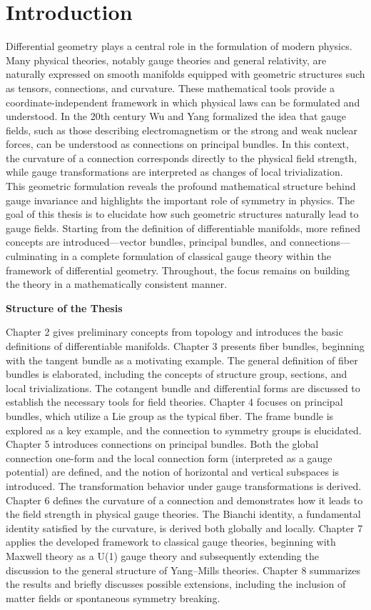 \chapter{Introduction}

Differential geometry plays a central role in the formulation of modern physics. Many physical theories, notably gauge theories and general relativity, are naturally expressed on smooth manifolds equipped with geometric structures such as tensors, connections, and curvature. These mathematical tools provide a coordinate-independent framework in which physical laws can be formulated and understood. In the 20th century Wu and Yang formalized the idea that gauge fields, such as those describing electromagnetism or the strong and weak nuclear forces, can be understood as connections on principal bundles\cite{WuConceptnonintegrablephasefactorsglobalformulationgaugefields1975}. In this context, the curvature of a connection corresponds directly to the physical field strength, while gauge transformations are interpreted as changes of local trivialization. This geometric formulation reveals the profound mathematical structure behind gauge invariance and highlights the important role of symmetry in physics. The goal of this thesis is to elucidate how such geometric structures naturally lead to gauge fields. Starting from the definition of differentiable manifolds, more refined concepts are introduced—vector bundles, principal bundles, and connections—culminating in a complete formulation of classical gauge theory within the framework of differential geometry. Throughout, the focus remains on building the theory in a mathematically consistent manner. 

\textbf{Structure of the Thesis}

Chapter 2 gives preliminary concepts from topology and introduces the basic definitions of differentiable manifolds. Chapter 3 presents fiber bundles, beginning with the tangent bundle as a motivating example. The general definition of fiber bundles is elaborated, including the concepts of structure group, sections, and local trivializations. The cotangent bundle and differential forms are discussed to establish the necessary tools for field theories. Chapter 4 focuses on principal bundles, which utilize a Lie group as the typical fiber. The frame bundle is explored as a key example, and the connection to symmetry groups is elucidated. Chapter 5 introduces connections on principal bundles. Both the global connection one-form and the local connection form (interpreted as a gauge potential) are defined, and the notion of horizontal and vertical subspaces is introduced. The transformation behavior under gauge transformations is derived. Chapter 6 defines the curvature of a connection and demonstrates how it leads to the field strength in physical gauge theories. The Bianchi identity, a fundamental identity satisfied by the curvature, is derived both globally and locally. Chapter 7 applies the developed framework to classical gauge theories, beginning with Maxwell theory as a U(1) gauge theory and subsequently extending the discussion to the general structure of Yang–Mills theories. Chapter 8 summarizes the results and briefly discusses possible extensions, including the inclusion of matter fields or spontaneous symmetry breaking. 

